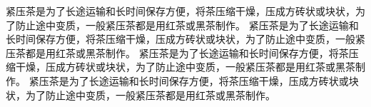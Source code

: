 \documentclass{article}
\newcommand{\cn}{\mktsFontfileSunexta\cjkgUseCjkGlue}
\begin{document}
\begin{multicols}{5}

{\cn
紧压茶是为了长途运输和长时间保存方便，将茶压缩干燥，压成方砖状或块状，为了防止途中变质，一般紧压茶都是用红茶或黑茶制作。
紧压茶是为了长途运输和长时间保存方便，将茶压缩干燥，压成方砖状或块状，为了防止途中变质，一般紧压茶都是用红茶或黑茶制作。
紧压茶是为了长途运输和长时间保存方便，将茶压缩干燥，压成方砖状或块状，为了防止途中变质，一般紧压茶都是用红茶或黑茶制作。
紧压茶是为了长途运输和长时间保存方便，将茶压缩干燥，压成方砖状或块状，为了防止途中变质，一般紧压茶都是用红茶或黑茶制作。
}

\end{multicols}
\end{document}
